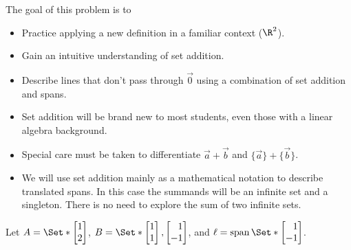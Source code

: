 \documentclass{problemset}
\DeclareMathOperator{\Span}{span}
\newcommand{\mat}[1]{\begin{bmatrix*}[r]#1\end{bmatrix*}}
\begin{document}
	\question
	\begin{annotation}
		\begin{goals}

			The goal of this problem is to
			\begin{itemize}
				\item Practice applying a new definition in a familiar context ($\R^2$).
				\item Gain an intuitive understanding of set addition.
				\item Describe lines that don't pass through $\vec 0$ using
					a combination of set addition and spans.
			\end{itemize}
		\end{goals}

		\begin{notes}
			\begin{itemize}
				\item Set addition will be brand new to most students, even
					those with a linear algebra background.
				\item Special care must be taken to differentiate
					$\vec a+\vec b$ and $\{\vec a\}+\{\vec b\}$.
				\item We will use set addition mainly as a mathematical
					notation to describe translated spans. In this
					case the summands will be an infinite set
					and a singleton. There is no need to explore the sum
					of two infinite sets.
			\end{itemize}
		\end{notes}
	\end{annotation}
	Let $A=\Set*{\mat{1\\2}}$, $B=\Set*{\mat{1\\1},\mat{1\\-1}}$,
	and $\ell=\Span\Set*{\mat{1\\-1}}$.
\end{document}
